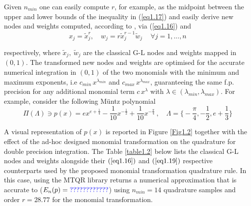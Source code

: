 \documentclass[a4paper, twosided]{book}
\newcommand{\GL}[1]{\textcolor{blue}{#1}}
\begin{document}
\noindent
Given $n_{min}$ one can easily compute $r$, for example, as the midpoint between the upper and lower bounds of the inequality in (\ref{eq1.17}) and easily derive new nodes and weights computed, according to \cite{Lombardi09,Lombardi21}, via (\ref{eq1.16}) and 
\begin{equation}\label{eq1.19}
    x_j=\tilde{x}_j^{r},\quad w_j = r\tilde{x}_j^{r-1}\tilde{w}_j\,\quad\forall j=1,...,n
\end{equation}

\noindent
respectively, where $\tilde{x}_j,\:\tilde{w}_j$ are the classical G-L nodes and weights mapped in $(0,1)$. The transformed new nodes and weights are optimised for the accurate numerical integration in $(0,1)$ of the two monomials with the minimum and maximum exponents, i.e $c_{min}\,x^{\lambda_{min}}$ and $c_{max}\,x^{\lambda_{max}}$, guaranteeing the same f.p. precision for any additional monomial term $c\,x^\lambda$ with $\lambda \in (\lambda_{min},\lambda_{max})$. For example, consider the following  Müntz polynomial
\begin{equation}\label{eq1.20}
    \Pi(\Lambda)\ni p(x) = ex^{e+\frac{1}{4}} -\frac{1}{10}x^{-\frac{1}{2}} + \frac{1}{10}x^{-\frac{\pi}{4}}\,,\quad\Lambda=\Big\{-\frac{\pi}{4},-\frac{1}{2},e+\frac{1}{3}\Big\}
\end{equation}

\noindent
A visual representation of $p(x)$ is reported in Figure \ref{Fig1.2} together with the effect of the ad-hoc designed monomial transformation on the quadrature for double precision integration. The Table \ref{table1.2} below lists the classical G-L nodes and weights alongside their $(\ref{eq1.16})$ and $(\ref{eq1.19})$ respective counterparts used by the proposed monomial transformation quadrature rule. In this case, using the MTQR library returns a numerical approximation that is accurate to ($E_n(p)=\GL{????????????}$) using $n_{min}=14$ quadrature samples and order $r=28.77$ for the monomial transformation.
\end{document}
